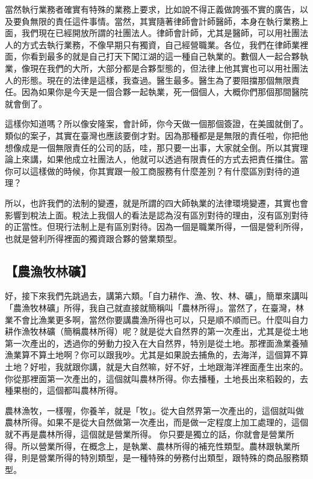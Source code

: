 \documentclass[]{ctexbook}
\begin{document}
當然執行業務者確實有特殊的業務上要求，比如說不得正義做誇張不實的廣告，以及要負無限的責任這件事情。當然，其實隨著律師會計師醫師，本身在執行業務上面，我們現在已經開放所謂的社團法人。律師會計師，尤其是醫師，可以用社團法人的方式去執行業務，不像早期只有獨資，自己經營職業。各位，我們在律師業裡面，你看到最多的就是自己打天下闖江湖的這一種自己執業的。數個人一起合夥執業，像現在我們的大所，大部分都是合夥型態的，但法律上他其實也可以用社團法人的形態。現在的法律是這樣，我查過。醫生最多。醫生為了要阻擋那個無限責任。因為如果你是今天是一個合夥一起執業，死一個個人，大概你們那個那間醫院就會倒了。

這樣你知道嗎？所以像安隆案，會計師，你今天做一個那個簽證，在美國就倒了。類似的案子，其實在臺灣也應該要倒才對。因為那種都是是無限的責任啦，你把他想像成是一個無限責任的公司的話，哇，那只要一出事，大家就全倒。所以其實理論上來講，如果他成立社團法人，他就可以透過有限責任的方式去把責任擋住。當你可以這樣做的時候，你其實跟一般工商服務有什麼差別？有什麼區別對待的道理？

所以，也許我們的法制的變遷，就是所謂的四大師執業的法律環境變遷，其實也會影響到稅法上面。稅法上我個人的看法是認為沒有區別對待的理由，沒有區別對待的正當性。但現行法制上是有區別對待。因為一個是職業所得，一個是營利所得，也就是營利所得裡面的獨資跟合夥的營業類型。

\hypertarget{ux8fb2ux6f01ux7267ux6797ux7926}{%
\subsection{【農漁牧林礦】}\label{ux8fb2ux6f01ux7267ux6797ux7926}}

好，接下來我們先跳過去，講第六類。「自力耕作、漁、牧、林、礦」，簡單來講叫「農漁牧林礦」所得，我自己就直接就簡稱叫「農林所得」。當然了，在臺灣，林業不會比漁業更多啊，當然你要講農漁所得也可以，只是順不順而已。什麼叫自力耕作漁牧林礦（簡稱農林所得）呢？就是從大自然界的第一次產出，尤其是從土地第一次產出的，透過你的勞動力投入在大自然界，特別是從土地。那裡面漁業養殖漁業算不算土地啊？你可以跟我吵。尤其是如果說去捕魚的，去海洋，這個算不算土地？好啦，我就跟你講，就是大自然嘛，好不好，土地跟海洋裡面產生出來的。你從那裡面第一次產出的，這個就叫農林所得。你去播種，土地長出來稻穀的，去種果樹的，這個都叫農林所得。

農林漁牧，一樣喔，你養羊，就是「牧」。從大自然界第一次產出的，這個就叫做農林所得。如果不是從大自然做第一次產出，而是做一定程度上加工處理的，這個就不再是農林所得，這個就是營業所得。
你只要是獨立的話，你就會是營業所得。所以營業所得，在概念上，是執業、農林所得的補充性類型。農林跟執業所得，則是營業所得的特別類型，是一種特殊的勞務付出類型，跟特殊的商品服務類型。
\end{document}
